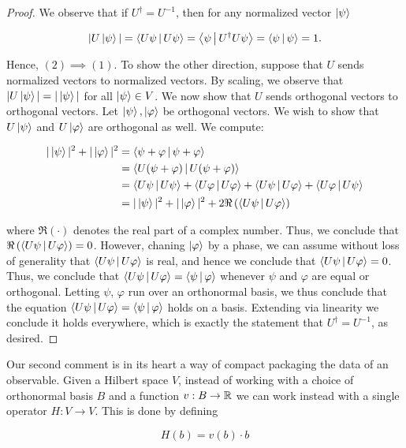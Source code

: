 \begin{proof} We observe that if $U^\dagger=U^{-1}$, then for any normalized vector $\ket{\psi}$

$$|U\ket{\psi}|=\Braket{U \psi | U \psi}=\Braket{\psi | U^\dagger U \psi}=\Braket{\psi | \psi} =1.$$

Hence, $(2)\implies (1)$. To show the other direction, suppose that $U$ sends normalized vectors to normalized vectors. By scaling, we observe that $|U\ket{\psi}|=|\ket{\psi}|$ for all $\ket{\psi}\in V$. We now show that $U$ sends orthogonal vectors to orthogonal vectors. Let $\ket{\psi},\ket{\varphi}$ be orthogonal vectors. We wish to show that $U\ket{\psi}$ and $U\ket{\varphi}$ are orthogonal as well. We compute:

\begin{align*}
|\ket{\psi}|^2+|\ket{\varphi}|^2&=\Braket{\psi+\varphi | \psi+ \varphi}\\
&=\Braket{U(\psi+\varphi) | U(\psi+ \varphi)}\\
&=\Braket{U\psi | U\psi}+\Braket{U\varphi | U \varphi}+\Braket{U\psi | U\varphi}+\Braket{U\varphi | U\psi}\\
&=|\ket{\psi}|^2+|\ket{\varphi}|^2+2\Re\left(\Braket{U\psi | U\varphi}\right)\\
\end{align*}

where $\Re(\cdot)$ denotes the real part of a complex number. Thus, we conclude that $\Re\left(\Braket{U\psi | U\varphi}\right)=0$. However, chaning $\ket{\varphi}$ by a phase, we can assume without loss of generality that $\Braket{U\psi | U\varphi}$ is real, and hence we conclude that $\Braket{U\psi | U\varphi}=0$. Thus, we conclude that $\Braket{U\psi | U\varphi}=\Braket{\psi | \varphi}$ whenever $\psi$ and $\varphi$ are equal or orthogonal. Letting $\psi$, $\varphi$ run over an orthonormal basis, we thus conclude that the equation $\Braket{U\psi | U\varphi}=\Braket{\psi | \varphi}$ holds on a basis. Extending via linearity we conclude it holds everywhere, which is exactly the statement that $U^\dagger=U^{-1}$, as desired. 
\end{proof}

Our second comment is in its heart a way of compact packaging the data of an observable. Given a Hilbert space $V$, instead of working with a choice of orthonormal basis $B$ and a function $v:B\to \mathbb{R}$ we can work instead with a single operator $H:V\to V$. This is done by defining

$$H(b)=v(b)\cdot b$$


